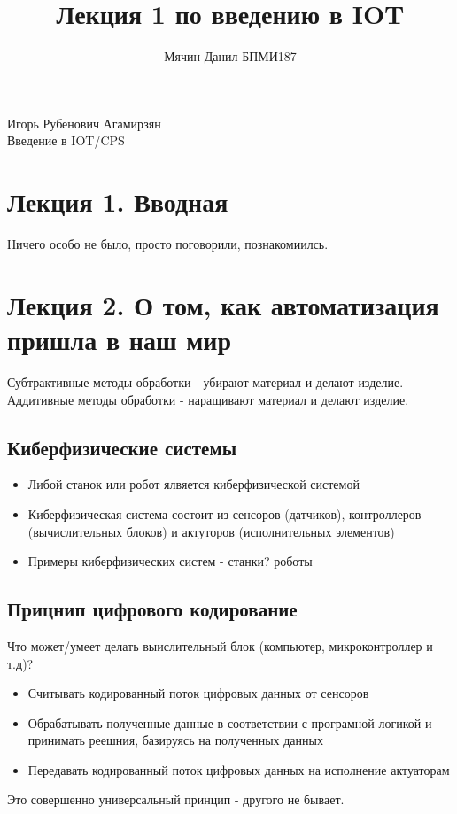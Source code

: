 \documentclass{article}
\title{Лекция 1 по введению в IOT}
\author{Мячин Данил БПМИ187}
\date
\theoremstyle{problemstyle}
\theoremstyle{ans}
\begin{document}
\begin{center}
Игорь Рубенович Агамирзян\\
Введение в IOT/CPS
\end{center}
\tableofcontents
\newpage
\section{Лекция 1. Вводная}
Ничего особо не было, просто поговорили, познакомиилсь.
\newpage
\section{Лекция 2. О том, как автоматизация пришла в наш мир}
Субтрактивные методы обработки - убирают материал и делают изделие.\\
Аддитивные методы обработки - наращивают материал и делают изделие.

\subsection{Киберфизические системы}
\begin{itemize}
    \item Либой станок или робот ялвяется киберфизической системой
    \item Киберфизическая система состоит из сенсоров (датчиков), контроллеров (вычислительных блоков) и актуторов (исполнительных элементов)
    \item Примеры киберфизических систем - станки? роботы 
\end{itemize}

\subsection{Прицнип цифрового кодирование}

Что может/умеет делать выислительный блок (компьютер, микроконтроллер и т.д)?

\begin{itemize}
    \item Считывать кодированный поток цифровых данных от сенсоров
    \item Обрабатывать полученные данные в соответствии с програмной логикой и принимать реешния, базируясь на полученных данных
    \item Передавать кодированный поток цифровых данных на исполнение актуаторам
\end{itemize}

Это совершенно универсальный принцип - другого не бывает.
\end{document}
